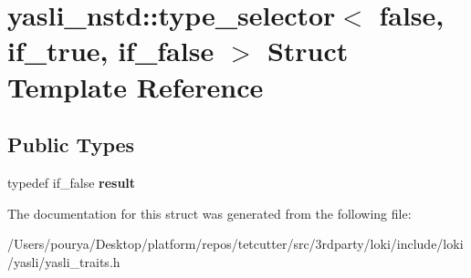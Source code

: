 \hypertarget{structyasli__nstd_1_1type__selector_3_01false_00_01if__true_00_01if__false_01_4}{}\section{yasli\+\_\+nstd\+:\+:type\+\_\+selector$<$ false, if\+\_\+true, if\+\_\+false $>$ Struct Template Reference}
\label{structyasli__nstd_1_1type__selector_3_01false_00_01if__true_00_01if__false_01_4}
\subsection*{Public Types}
\begin{DoxyCompactItemize}
\item 
\hypertarget{structyasli__nstd_1_1type__selector_3_01false_00_01if__true_00_01if__false_01_4_a32bffee7e9a2dcb086939f1af9d0c85f}{}typedef if\+\_\+false {\bfseries result}\label{structyasli__nstd_1_1type__selector_3_01false_00_01if__true_00_01if__false_01_4_a32bffee7e9a2dcb086939f1af9d0c85f}

\end{DoxyCompactItemize}


The documentation for this struct was generated from the following file\+:\begin{DoxyCompactItemize}
\item 
/\+Users/pourya/\+Desktop/platform/repos/tetcutter/src/3rdparty/loki/include/loki/yasli/yasli\+\_\+traits.\+h\end{DoxyCompactItemize}
